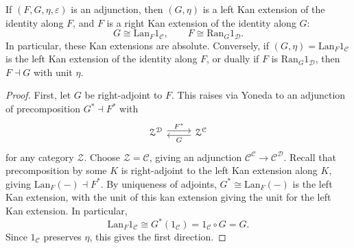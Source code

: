 \begin{theorem}[Adjunctions]\label{thm:10.6}
	If $(F,G,\eta,\varepsilon )$ is an adjunction, then $(G,\eta)$ is a left Kan extension  of the identity along $F$, and $F$ is a right Kan extension of the identity along $G$:
	\[
		G\cong \mathrm{Lan} _F1_\mathcal{C} ,\qquad F\cong \mathrm{Ran} _G1_\mathcal{D} 
	.\]
	In particular, these Kan extensions are absolute. Conversely, if $(G,\eta)=\mathrm{Lan} _F1_\mathcal{C} $ is the left Kan extension of the identity along $F$, or dually if $F$ is $\mathrm{Ran} _G1_\mathcal{D} $, then $F\dashv G$ with unit $\eta$.
\end{theorem}
\begin{proof}
	First, let $G$ be right-adjoint to $F$. This raises via Yoneda to an adjunction of precomposition $G^* \dashv F^*$ with
	\[\begin{tikzcd}[row sep = 2.5em, column sep = 2.5em]
	\mathcal{Z} ^{\mathcal{D} } \ar[" F^* ", shift left, r]  & \mathcal{Z} ^{\mathcal{C} } \ar[" G ", shift left, l] 
	\end{tikzcd}\]
	for any category $\mathcal{Z} $. Choose $\mathcal{Z} =\mathcal{C} $, giving an adjunction $\mathcal{C} ^\mathcal{C} \to \mathcal{C} ^\mathcal{D} $. Recall that precomposition by some $K$ is right-adjoint to the left Kan extension along $K$, giving $\mathrm{Lan}_F(-)\dashv F^*$. By uniqueness of adjoints, $G^*\cong \mathrm{Lan} _F(-)$ is the left Kan extension, with the unit of this kan extension giving the unit for the left Kan extension. In particular,
	\[
		\mathrm{Lan} _F1_\mathcal{C} \cong G^*(1_\mathcal{C} )=1_\mathcal{C} \circ G=G
	.\]
	Since $1_\mathcal{C} $ preserves $\eta$, this gives the first direction.


\end{proof}
